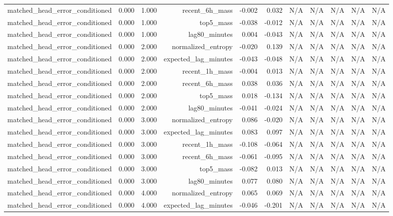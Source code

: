 \begin{table}[h!]
\begin{tabular}{lrrrrrrrrrr}
matched\_head\_error\_conditioned & 0.000 & 1.000 & recent\_6h\_mass & -0.002 & 0.032 & N/A & N/A & N/A & N/A & N/A \\
matched\_head\_error\_conditioned & 0.000 & 1.000 & top5\_mass & -0.038 & -0.012 & N/A & N/A & N/A & N/A & N/A \\
matched\_head\_error\_conditioned & 0.000 & 1.000 & lag80\_minutes & 0.004 & -0.043 & N/A & N/A & N/A & N/A & N/A \\
matched\_head\_error\_conditioned & 0.000 & 2.000 & normalized\_entropy & -0.020 & 0.139 & N/A & N/A & N/A & N/A & N/A \\
matched\_head\_error\_conditioned & 0.000 & 2.000 & expected\_lag\_minutes & -0.043 & -0.048 & N/A & N/A & N/A & N/A & N/A \\
matched\_head\_error\_conditioned & 0.000 & 2.000 & recent\_1h\_mass & -0.004 & 0.013 & N/A & N/A & N/A & N/A & N/A \\
matched\_head\_error\_conditioned & 0.000 & 2.000 & recent\_6h\_mass & 0.038 & 0.036 & N/A & N/A & N/A & N/A & N/A \\
matched\_head\_error\_conditioned & 0.000 & 2.000 & top5\_mass & 0.018 & -0.134 & N/A & N/A & N/A & N/A & N/A \\
matched\_head\_error\_conditioned & 0.000 & 2.000 & lag80\_minutes & -0.041 & -0.024 & N/A & N/A & N/A & N/A & N/A \\
matched\_head\_error\_conditioned & 0.000 & 3.000 & normalized\_entropy & 0.086 & -0.020 & N/A & N/A & N/A & N/A & N/A \\
matched\_head\_error\_conditioned & 0.000 & 3.000 & expected\_lag\_minutes & 0.083 & 0.097 & N/A & N/A & N/A & N/A & N/A \\
matched\_head\_error\_conditioned & 0.000 & 3.000 & recent\_1h\_mass & -0.108 & -0.064 & N/A & N/A & N/A & N/A & N/A \\
matched\_head\_error\_conditioned & 0.000 & 3.000 & recent\_6h\_mass & -0.061 & -0.095 & N/A & N/A & N/A & N/A & N/A \\
matched\_head\_error\_conditioned & 0.000 & 3.000 & top5\_mass & -0.082 & 0.013 & N/A & N/A & N/A & N/A & N/A \\
matched\_head\_error\_conditioned & 0.000 & 3.000 & lag80\_minutes & 0.077 & 0.080 & N/A & N/A & N/A & N/A & N/A \\
matched\_head\_error\_conditioned & 0.000 & 4.000 & normalized\_entropy & 0.065 & 0.069 & N/A & N/A & N/A & N/A & N/A \\
matched\_head\_error\_conditioned & 0.000 & 4.000 & expected\_lag\_minutes & -0.046 & -0.201 & N/A & N/A & N/A & N/A & N/A \\

\end{tabular}
\end{table}
